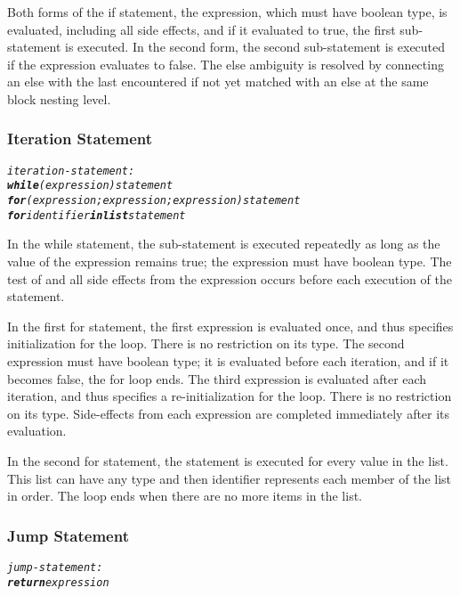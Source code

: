 \documentclass[12pt]{report}
\begin{document}
Both forms of the if statement, the expression, which must have boolean type, is evaluated, including all side effects, and if it evaluated to true, the first sub-statement is executed. In the second form, the second sub-statement is executed if the expression evaluates to false. The else ambiguity is resolved by connecting an else with the last encountered if not yet matched with an else at the same block nesting level.

\subsubsection{Iteration Statement}

\begin{alltt}\begin{singlespace}
         \textit{iteration-statement:}
              \textit{\textbf{while} (expression) statement}
              \textit{\textbf{for} (expression; expression; expression) statement}
              \textit{\textbf{for} identifier \textbf{in list} statement}\end{singlespace}
\end{alltt}

In the while statement, the sub-statement is executed repeatedly as long as the value of the expression remains true; the expression must have boolean type. The test of and all side effects from the expression occurs before each execution of the statement.

In the first for statement, the first expression is evaluated once, and thus specifies initialization for the loop. There is no restriction on its type. The second expression must have boolean type; it is evaluated before each iteration, and if it becomes false, the for loop ends. The third expression is evaluated after each iteration, and thus specifies a re-initialization for the loop. There is no restriction on its type. Side-effects from each expression are completed immediately after its evaluation.

In the second for statement, the statement is executed for every value in the list. This list can have any type and then identifier represents each member of the list in order. The loop ends when there are no more items in the list.

\subsubsection{Jump Statement}

\begin{alltt}\begin{singlespace}
         \textit{jump-statement:}
              \textit{\textbf{return} expression}\end{singlespace}
\end{alltt}
\end{document}
